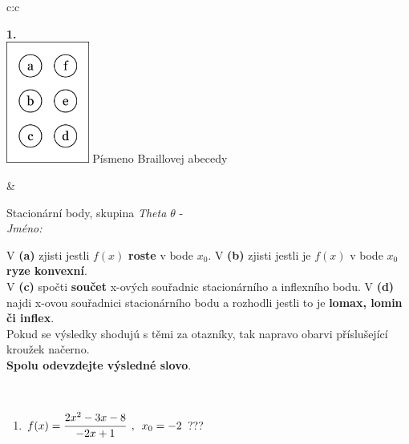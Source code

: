 \documentclass[10pt]{report}
\begin{document}
\begin{tabular}{c:c}
\begin{minipage}[c][104.5mm][t]{0.5\linewidth}
\begin{center}
\begin{minipage}{0.79\linewidth}
\end{minipage}
\begin{minipage}{0.20\linewidth}
\begin{center}
{\Huge\bfseries 1.} \\[2mm]
\includegraphics[height=40mm]{../images/braille.png}
{\small Písmeno Braillovej abecedy}
\end{center}
\end{minipage}
\end{center}
\end{minipage}
&
\begin{minipage}[c][104.5mm][t]{0.5\linewidth}
\begin{center}
\vspace{7mm}
{\huge Stacionární body, skupina \textit{Theta $\theta$} -}\\[5mm]
\textit{Jméno:}\phantom{xxxxxxxxxxxxxxxxxxxxxxxxxxxxxxxxxxxxxxxxxxxxxxxxxxxxxxxxxxxxxxxxx}\\[5mm]
\begin{minipage}{0.95\linewidth}
\begin{center}
{\small V \textbf{(a)} zjisti jestli $f(x)$ \textbf{roste} v bode $x_0$. V \textbf{(b)} zjisti jestli je $f(x)$ v bode $x_0$ \textbf{ryze konvexní}.\\V \textbf{(c)} spočti \textbf{součet} x-ových souřadnic stacionárního a inflexního bodu. V \textbf{(d)} najdi x-ovou souřadnici stacionárního bodu a rozhodli jestli to je \textbf{lomax, lomin či inflex}.\\Pokud se výsledky shodujú s těmi za otazníky, tak napravo obarvi příslušející kroužek načerno.\\\textbf{Spolu odevzdejte výsledné slovo}}.
\end{center}
\end{minipage}
\\[1mm]
\begin{minipage}{0.79\linewidth}
\begin{center}
\begin{varwidth}{\linewidth}
\begin{enumerate}
\normalsize
\item $f(x)=\cfrac{2x^2-3x-8}{-2x+1}\enspace , \enspace x_0=-2$\quad \dotfill\; ???\;\dotfill \quad {}

\end{enumerate}
\end{varwidth}
\end{center}
\end{minipage}
\end{center}
\end{minipage}
\end{tabular}
\end{document}
